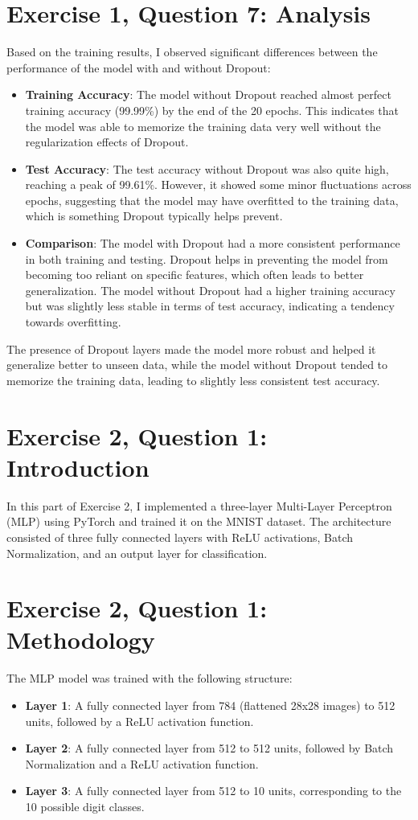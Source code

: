 \documentclass[10pt,letter,notitlepage]{article}
\begin{document}
\begin{center}
\section{Exercise 1, Question 7: Analysis}
Based on the training results, I observed significant differences between the performance of the model with and without Dropout:
\begin{itemize}
    \item \textbf{Training Accuracy}: The model without Dropout reached almost perfect training accuracy (99.99\%) by the end of the 20 epochs. This indicates that the model was able to memorize the training data very well without the regularization effects of Dropout.
    \item \textbf{Test Accuracy}: The test accuracy without Dropout was also quite high, reaching a peak of 99.61\%. However, it showed some minor fluctuations across epochs, suggesting that the model may have overfitted to the training data, which is something Dropout typically helps prevent.
    \item \textbf{Comparison}: The model with Dropout had a more consistent performance in both training and testing. Dropout helps in preventing the model from becoming too reliant on specific features, which often leads to better generalization. The model without Dropout had a higher training accuracy but was slightly less stable in terms of test accuracy, indicating a tendency towards overfitting.
\end{itemize}

The presence of Dropout layers made the model more robust and helped it generalize better to unseen data, while the model without Dropout tended to memorize the training data, leading to slightly less consistent test accuracy.

\section{Exercise 2, Question 1: Introduction}
In this part of Exercise 2, I implemented a three-layer Multi-Layer Perceptron (MLP) using PyTorch and trained it on the MNIST dataset. The architecture consisted of three fully connected layers with ReLU activations, Batch Normalization, and an output layer for classification.

\section{Exercise 2, Question 1: Methodology}
The MLP model was trained with the following structure:
\begin{itemize}
    \item \textbf{Layer 1}: A fully connected layer from 784 (flattened 28x28 images) to 512 units, followed by a ReLU activation function.
    \item \textbf{Layer 2}: A fully connected layer from 512 to 512 units, followed by Batch Normalization and a ReLU activation function.
    \item \textbf{Layer 3}: A fully connected layer from 512 to 10 units, corresponding to the 10 possible digit classes.
\end{itemize}


\end{center}
\end{document}
